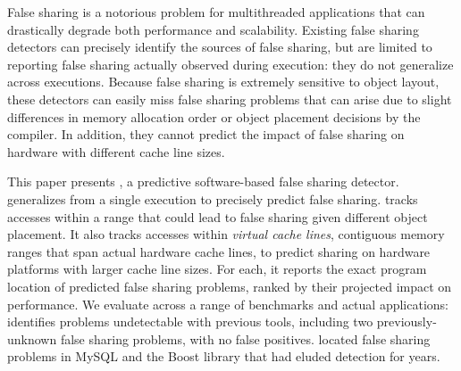

False sharing is a notorious problem for multithreaded applications
that can drastically degrade both performance and
scalability. Existing false sharing detectors can precisely identify
the sources of false sharing, but are limited to reporting false
sharing actually observed during execution: they do not generalize
across executions. Because false sharing is extremely sensitive to
object layout, these detectors can easily miss false sharing problems
that can arise due to slight differences in memory allocation order or
object placement decisions by the compiler. In addition, they cannot
predict the impact of false sharing on hardware with different cache
line sizes.


This paper presents \Predator{}, a predictive software-based false
sharing detector. \Predator{} generalizes from a single execution to
precisely predict false sharing. \predator{} tracks accesses within
a range that could lead to false sharing given
different object placement. It also tracks accesses within
\emph{virtual cache lines}, contiguous memory ranges that span actual
hardware cache lines, to predict sharing on hardware platforms with
larger cache line sizes. For each, it reports the exact program
location of predicted false sharing problems, ranked by their
projected impact on performance. We evaluate \Predator{} across a
range of benchmarks and actual applications: \Predator{} identifies
problems undetectable with previous tools, including two
previously-unknown false sharing problems, with no false
positives. \Predator{} located false sharing problems in MySQL and the
Boost library that had eluded detection for years.




